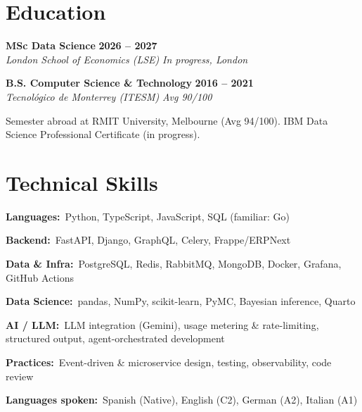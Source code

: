 \documentclass[10pt,a4paper]{article}
\newcommand{\role}[4]{%
  \textbf{#1} \hfill \textbf{#3}\\[1pt]
  {\color{soft}\textit{#2} \hfill \textit{#4}}\par\vspace{2pt}}
\newcommand{\skill}[2]{\textbf{\color{soft}#1:}\ #2\par\vspace{1.5pt}}
\begin{document}
\section*{Education}
\role{MSc Data Science}{London School of Economics (LSE)}{2026 -- 2027}{In progress, London}
\vspace{3pt}
\role{B.S. Computer Science \& Technology}{Tecnológico de Monterrey (ITESM)}{2016 -- 2021}{Avg 90/100}
\vspace{1pt}
{\color{soft}\small Semester abroad at RMIT University, Melbourne (Avg 94/100). IBM Data Science Professional Certificate (in progress).}

\section*{Technical Skills}
\skill{Languages}{Python, TypeScript, JavaScript, SQL \;(familiar: Go)}
\skill{Backend}{FastAPI, Django, GraphQL, Celery, Frappe/ERPNext}
\skill{Data \& Infra}{PostgreSQL, Redis, RabbitMQ, MongoDB, Docker, Grafana, GitHub Actions}
\skill{Data Science}{pandas, NumPy, scikit-learn, PyMC, Bayesian inference, Quarto}
\skill{AI / LLM}{LLM integration (Gemini), usage metering \& rate-limiting, structured output, agent-orchestrated development}
\skill{Practices}{Event-driven \& microservice design, testing, observability, code review}
\skill{Languages spoken}{Spanish (Native), English (C2), German (A2), Italian (A1)}
\end{document}
